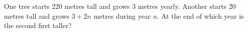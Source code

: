 One tree starts 220 metres tall and grows 3 metres yearly. Another starts 20 metres tall and grows $3+2n$ metres during year $n$. At the end of which year is the second first taller?
